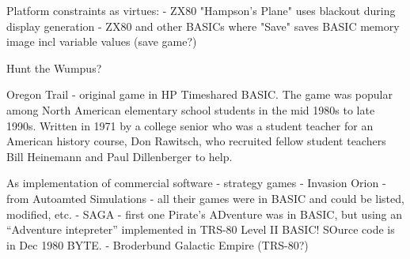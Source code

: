 Platform constraints as virtues:
 - ZX80 "Hampson's Plane" uses blackout during display generation 
 - ZX80 and other BASICs where "Save" saves BASIC memory image incl
 variable values (save game?)




Hunt the Wumpus?


Oregon Trail - original game in HP Timeshared BASIC.  The game was popular among
North American elementary school students in the mid 1980s to late
1990s.  Written  in 1971 by a college senior who was a student teacher for an
American history course, Don Rawitsch, who recruited fellow student
teachers Bill Heinemann and Paul Dillenberger to help.

As implementation of commercial software - strategy games
  - Invasion Orion - from Autoamted Simulations - all their games were
  in BASIC and could be listed, modified, etc.
  - SAGA - first one Pirate's ADventure was in BASIC, but using an
  ``Adventure intepreter'' implemented in TRS-80 Level II BASIC!  SOurce
  code is in Dec 1980 BYTE.
  - Broderbund Galactic Empire (TRS-80?)


